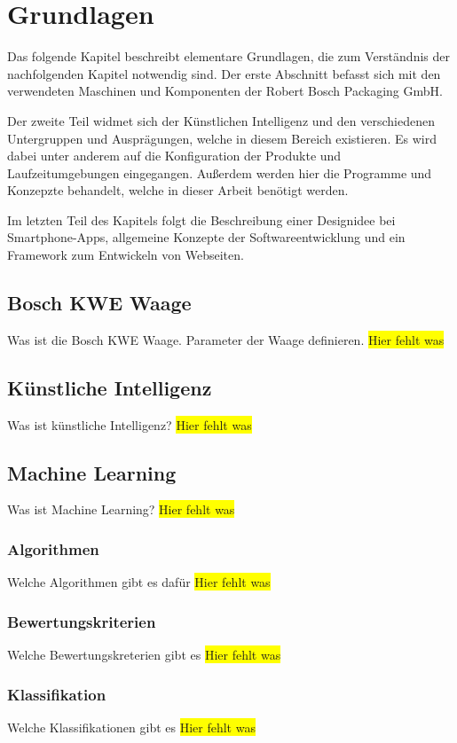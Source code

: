 \chapter{Grundlagen}
\label{ch:grundlagen}
Das folgende Kapitel beschreibt elementare Grundlagen, die zum Verständnis der nachfolgenden Kapitel notwendig sind. Der
erste Abschnitt befasst sich mit den verwendeten Maschinen und Komponenten der Robert Bosch Packaging GmbH.

Der zweite Teil widmet sich der Künstlichen Intelligenz und den verschiedenen Untergruppen und Ausprägungen, welche in
diesem Bereich existieren. Es wird dabei unter anderem auf die Konfiguration der Produkte und Laufzeitumgebungen
eingegangen. Außerdem werden hier die Programme und Konzepzte behandelt, welche in dieser Arbeit benötigt werden.

Im letzten Teil des Kapitels folgt die Beschreibung einer Designidee bei Smartphone-Apps, allgemeine Konzepte der
Softwareentwicklung und ein Framework zum Entwickeln von Webseiten.

\section{Bosch KWE Waage}
Was ist die Bosch KWE Waage. Parameter der Waage definieren.
\colorbox{yellow}{Hier fehlt was}

\section{Künstliche Intelligenz}
Was ist künstliche Intelligenz?
\colorbox{yellow}{Hier fehlt was}

\section{Machine Learning}
Was ist Machine Learning?
\colorbox{yellow}{Hier fehlt was}

\subsection{Algorithmen}
Welche Algorithmen gibt es dafür
\colorbox{yellow}{Hier fehlt was}

\subsection{Bewertungskriterien}
Welche Bewertungskreterien gibt es
\colorbox{yellow}{Hier fehlt was}

\subsection{Klassifikation}
Welche Klassifikationen gibt es
\colorbox{yellow}{Hier fehlt was}

